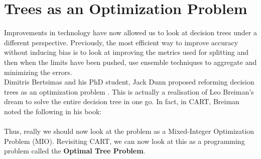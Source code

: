 \documentclass[11pt,a4paper]{report}
\begin{document}
\section{Trees as an Optimization Problem}
Improvements in technology have now allowed us to look at decision trees under a different perspective.
Previously, the most efficient way to improve accuracy without inducing bias is to look at improving the metrics used for splitting and then when the limits have been pushed, use ensemble techniques to aggregate and minimizing the errors.\\
Dimitris Bertsimas and his PhD student, Jack Dunn proposed reforming decision trees as an optimization problem \cite{oct}. 
This is actually a realisation of Leo Breiman's dream to solve the entire decision tree in one go.
In fact, in CART, Breiman noted the following \cite[p.42]{BreimanDT} in his book:
\bigskip\\
\bigskip\\
Thus, really we should now look at the problem as a Mixed-Integer Optimization Problem (MIO).
Revisiting CART, we can now look at this as a programming problem called the \textbf{Optimal Tree Problem}.
\end{document}
